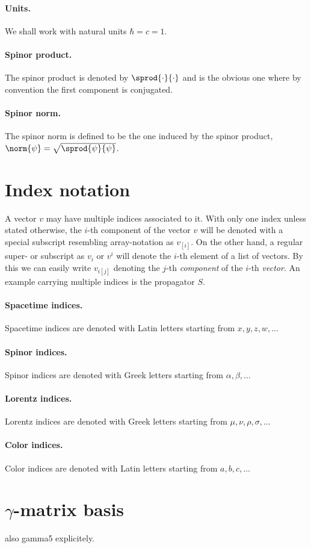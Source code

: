 \paragraph{Units.}
We shall work with natural units $\hbar = c = 1$.

\paragraph{Spinor product.}
The spinor product is denoted by $\sprod{\cdot}{\cdot}$ and is the obvious one where by convention the first component is conjugated.

\paragraph{Spinor norm.}
The spinor norm is defined to be the one induced by the spinor product, $\norm{\psi} = \sqrt{\sprod{\psi}{\psi}}$.

\section{Index notation}
\label{sec:notation:index}

A vector $v$ may have multiple indices associated to it.
With only one index unless stated otherwise, the $i$-th component of the vector $v$ will be denoted with a special subscript resembling array-notation as $v_{[i]}$.
On the other hand, a regular super- or subscript as $v_i$ or $v^{i}$ will denote the $i$-th element of a list of vectors.
By this we can easily write $v_{i [j]}$ denoting the $j$-th \emph{component} of the $i$-th \emph{vector}.
An example carrying multiple indices is the propagator $S$. 


\paragraph{Spacetime indices.}
Spacetime indices are denoted with Latin letters starting from $x, y, z, w, \ldots$

\paragraph{Spinor indices.}
Spinor indices are denoted with Greek letters starting from $\alpha, \beta, \ldots$

\paragraph{Lorentz indices.}
Lorentz indices are denoted with Greek letters starting from $\mu, \nu, \rho, \sigma, \ldots$

\paragraph{Color indices.}
Color indices are denoted with Latin letters starting from $a, b, c, \ldots$

\section{$\gamma$-matrix basis}

also gamma5 explicitely.

